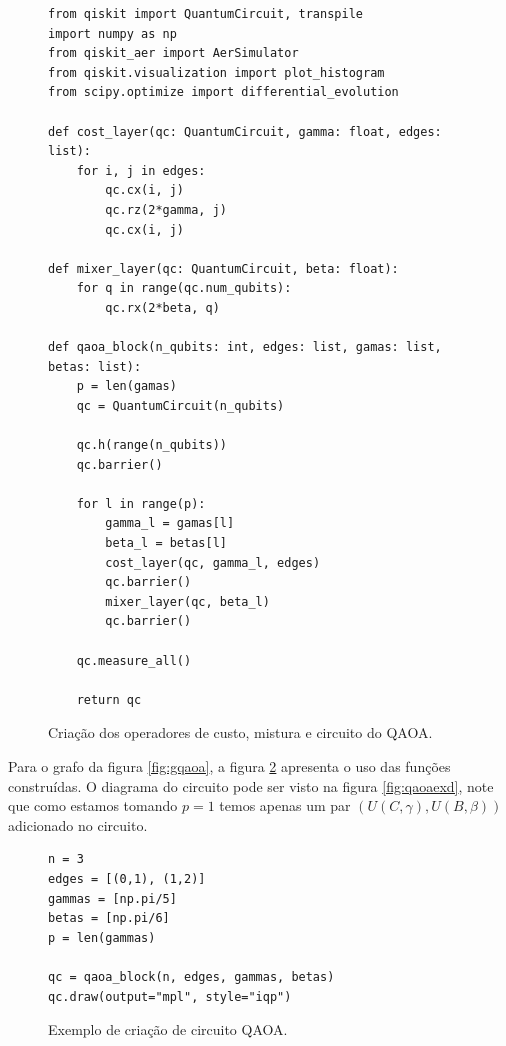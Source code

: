 \begin{figure}[!ht]
\centering
\begin{minipage}{1\textwidth}
\begin{lstlisting}[style=pythonstyle]
from qiskit import QuantumCircuit, transpile
import numpy as np
from qiskit_aer import AerSimulator
from qiskit.visualization import plot_histogram
from scipy.optimize import differential_evolution

def cost_layer(qc: QuantumCircuit, gamma: float, edges: list):
    for i, j in edges:
        qc.cx(i, j)
        qc.rz(2*gamma, j)
        qc.cx(i, j)

def mixer_layer(qc: QuantumCircuit, beta: float):
    for q in range(qc.num_qubits):
        qc.rx(2*beta, q)

def qaoa_block(n_qubits: int, edges: list, gamas: list, betas: list):
    p = len(gamas)
    qc = QuantumCircuit(n_qubits)

    qc.h(range(n_qubits))
    qc.barrier()

    for l in range(p):
        gamma_l = gamas[l]
        beta_l = betas[l]
        cost_layer(qc, gamma_l, edges)
        qc.barrier()
        mixer_layer(qc, beta_l)
        qc.barrier()

    qc.measure_all()

    return qc
\end{lstlisting}
\end{minipage}
\caption{Criação dos operadores de custo, mistura e circuito do QAOA.}
\label{fig:qaoacostop}
\end{figure}

\FloatBarrier

Para o grafo da figura \ref{fig:gqaoa}, a figura \ref{fig:qaoaex} apresenta o uso das funções construídas. O diagrama do circuito pode ser visto na figura \ref{fig:qaoaexd}, note que como estamos tomando $p=1$ temos apenas um par $(U(C,\gamma), U(B, \beta))$ adicionado no circuito.

\begin{figure}[!ht]
\centering
\begin{minipage}{1\textwidth}
\begin{lstlisting}[style=pythonstyle, firstnumber=36]
n = 3
edges = [(0,1), (1,2)]
gammas = [np.pi/5]
betas = [np.pi/6]
p = len(gammas)

qc = qaoa_block(n, edges, gammas, betas)
qc.draw(output="mpl", style="iqp")
\end{lstlisting}
\end{minipage}
\caption{Exemplo de criação de circuito QAOA.}
\label{fig:qaoaex}
\end{figure}

